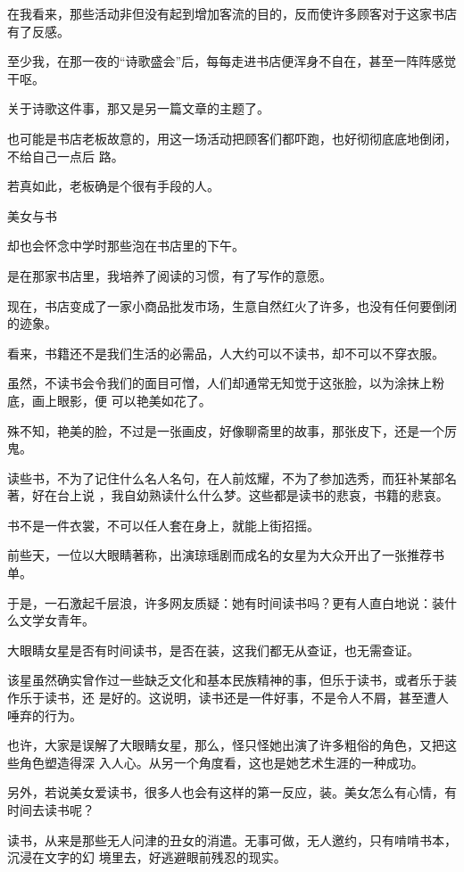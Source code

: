 \documentclass[12pt,a4paper]{article}
\newcommand{\subpart}[1]{
	\begingroup \par
	\vspace{1ex} \centering #1
	\par \endgroup \nopagebreak[4]
}
\begin{document}
		在我看来，那些活动非但没有起到增加客流的目的，反而使许多顾客对于这家书店有了反感。\par
		至少我，在那一夜的“诗歌盛会”后，每每走进书店便浑身不自在，甚至一阵阵感觉干呕。\par
		关于诗歌这件事，那又是另一篇文章的主题了。

		也可能是书店老板故意的，用这一场活动把顾客们都吓跑，也好彻彻底底地倒闭，不给自己一点后
	路。

		若真如此，老板确是个很有手段的人。


		\subpart{美女与书}

		却也会怀念中学时那些泡在书店里的下午。

		是在那家书店里，我培养了阅读的习惯，有了写作的意愿。\par
		现在，书店变成了一家小商品批发市场，生意自然红火了许多，也没有任何要倒闭的迹象。\par
		看来，书籍还不是我们生活的必需品，人大约可以不读书，却不可以不穿衣服。

		虽然，不读书会令我们的面目可憎，人们却通常无知觉于这张脸，以为涂抹上粉底，画上眼影，便
	可以艳美如花了。

		殊不知，艳美的脸，不过是一张画皮，好像聊斋里的故事，那张皮下，还是一个厉鬼。

		读些书，不为了记住什么名人名句，在人前炫耀，不为了参加选秀，而狂补某部名著，好在台上说
	，我自幼熟读什么什么梦。这些都是读书的悲哀，书籍的悲哀。

		书不是一件衣裳，不可以任人套在身上，就能上街招摇。

		前些天，一位以大眼睛著称，出演琼瑶剧而成名的女星为大众开出了一张推荐书单。\par
		于是，一石激起千层浪，许多网友质疑：她有时间读书吗？更有人直白地说：装什么文学女青年。\par
		大眼睛女星是否有时间读书，是否在装，这我们都无从查证，也无需查证。

		该星虽然确实曾作过一些缺乏文化和基本民族精神的事，但乐于读书，或者乐于装作乐于读书，还
	是好的。这说明，读书还是一件好事，不是令人不屑，甚至遭人唾弃的行为。

		也许，大家是误解了大眼睛女星，那么，怪只怪她出演了许多粗俗的角色，又把这些角色塑造得深
	入人心。从另一个角度看，这也是她艺术生涯的一种成功。

		另外，若说美女爱读书，很多人也会有这样的第一反应，装。美女怎么有心情，有时间去读书呢？

		读书，从来是那些无人问津的丑女的消遣。无事可做，无人邀约，只有啃啃书本，沉浸在文字的幻
	境里去，好逃避眼前残忍的现实。
\end{document}
